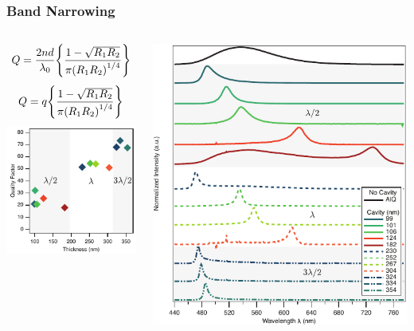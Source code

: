 \documentclass{beamer}
\begin{document}
        \begin{frame}
            \frametitle{Band Narrowing}
            \begin{columns}
                \begin{column}{0.4\textwidth}
					\centering
					$$Q=\frac{2nd}{\lambda_0}\qty{\frac{1-\sqrt{R_1R_2}}{\pi\qty(R_1R_2)^{1/4}}}$$
					$$Q=q\qty{\frac{1-\sqrt{R_1R_2}}{\pi\qty(R_1R_2)^{1/4}}}$$
					\includegraphics[width=\textwidth]{images/n1_quality_factor.png}
                \end{column}
                \begin{column}{0.6\textwidth}
					\centering
					\includegraphics[width=\textwidth]{images/n1_spectra.png}

\end{column}
\end{columns}
\end{frame}
\end{document}

